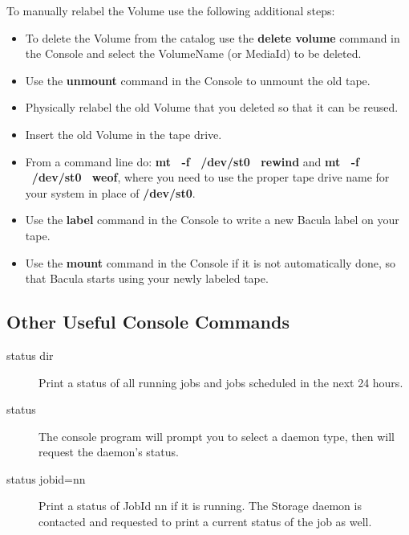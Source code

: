 {{To manually relabel the Volume use the following additional steps: 

\begin{itemize}
\item To delete the Volume from the catalog use the {\bf delete volume} 
   command in the Console and select the VolumeName (or MediaId) to be  deleted. 

\item Use the {\bf unmount} command in the Console to unmount the  old tape.  
\item Physically relabel the old Volume that you deleted so that it  can be
   reused.  
\item Insert the old Volume in the tape drive.  
\item From a command line do: {\bf mt \ -f \ /dev/st0 \ rewind} and  {\bf mt \
   -f \ /dev/st0 \ weof}, where you need to use the proper  tape drive name for
   your system in place of {\bf /dev/st0}.  
\item Use the {\bf label} command in the Console to write a new  Bacula label
   on your tape.  
\item Use the {\bf mount} command in the Console if it is not automatically 
   done, so that Bacula starts using your newly labeled tape. 
   \end{itemize}

\subsection*{Other Useful Console Commands}

\begin{description}

\item [status dir]
   Print a status of all running jobs and jobs  scheduled in the next 24 hours.  

\item [status]
   The console program will prompt you to select  a daemon type, then will
request the daemon's status.  

\item [status jobid=nn]
   Print a status of JobId nn if it is running.  The Storage daemon is contacted
and requested to print a current  status of the job as well.  


\end{description}}}
